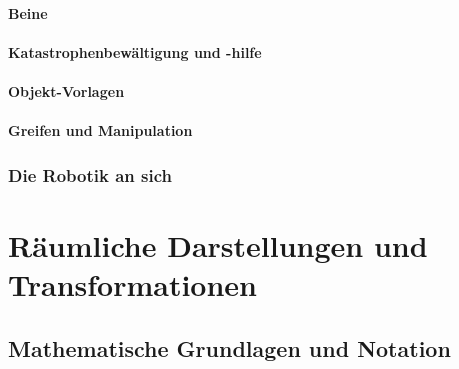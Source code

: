			\subsubsection{Beine} %

			\subsubsection{Katastrophenbewältigung und -hilfe} %

			\subsubsection{Objekt-Vorlagen} %

			\subsubsection{Greifen und Manipulation} %

		\subsection{Die Robotik an sich} %

\chapter{Räumliche Darstellungen und Transformationen}
	\section{Mathematische Grundlagen und Notation}

